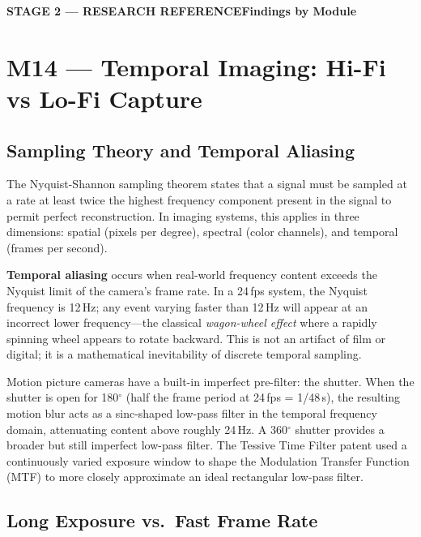 \documentclass[11pt,letterpaper]{article}
\newcommand{\stageheader}[2]{%
  \begin{tcolorbox}[colback=Primary,colframe=Primary,arc=2pt,left=8pt,right=8pt,top=6pt,bottom=6pt]
    \textbf{\large\sffamily\color{white}#1}\hfill\textbf{\sffamily\color{white!80!Primary}#2}
  \end{tcolorbox}%
}
\begin{document}
\newpage

\stageheader{STAGE 2 — RESEARCH REFERENCE}{Findings by Module}

\section{M14 — Temporal Imaging: Hi-Fi vs Lo-Fi Capture}

\subsection{Sampling Theory and Temporal Aliasing}

The Nyquist-Shannon sampling theorem states that a signal must be sampled at a rate at least twice the highest frequency component present in the signal to permit perfect reconstruction. In imaging systems, this applies in three dimensions: spatial (pixels per degree), spectral (color channels), and temporal (frames per second).

\textbf{Temporal aliasing} occurs when real-world frequency content exceeds the Nyquist limit of the camera's frame rate. In a 24\,fps system, the Nyquist frequency is 12\,Hz; any event varying faster than 12\,Hz will appear at an incorrect lower frequency---the classical \emph{wagon-wheel effect} where a rapidly spinning wheel appears to rotate backward. This is not an artifact of film or digital; it is a mathematical inevitability of discrete temporal sampling.

Motion picture cameras have a built-in imperfect pre-filter: the shutter. When the shutter is open for 180$^\circ$ (half the frame period at 24\,fps = 1/48\,s), the resulting motion blur acts as a sinc-shaped low-pass filter in the temporal frequency domain, attenuating content above roughly 24\,Hz. A 360$^\circ$ shutter provides a broader but still imperfect low-pass filter. The Tessive Time Filter patent used a continuously varied exposure window to shape the Modulation Transfer Function (MTF) to more closely approximate an ideal rectangular low-pass filter.

\subsection{Long Exposure vs.\ Fast Frame Rate}
\end{document}
